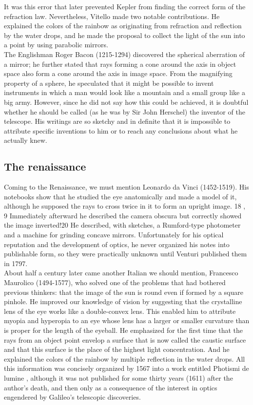             It was this error that later prevented Kepler from finding the correct form of the refraction law. Nevertheless, Vitello made two notable contributions. He explained the colors of the rainbow as originating from refraction and reflection by the water drops, and he made the proposal to collect the light of the sun into a point by using parabolic mirrors.\\

            The Englishman Roger Bacon (1215-1294) discovered the spherical aberration of a mirror; he further stated that rays forming a cone around the axis in object space also form a cone around the axis in image space. From the magnifying property of a sphere, he speculated that it might be possible to invent instruments in which a man would look like a mountain and a small group like a big army. However, since he did not say how this could be achieved, it is doubtful whether he should be called (as he was by Sir John Herschel) the inventor of the telescope. His writings are so sketchy and in definite that it is impossible to attribute specific inventions to him or to reach any conclusions about what he actually knew.

        \subsection{The renaissance}

            Coming to the Renaissance, we must mention Leonardo da Vinci (1452-1519). His notebooks show that he studied the eye anatomically and made a model of it, although he supposed the rays to cross twice in it to form an upright image. 18 , 9 Immediately afterward he described the camera obscura but correctly showed the image inverted!20 He described, with sketches, a Rumford-type photometer and a machine for grinding concave mirrors. Unfortunately for his optical reputation and the development of optics, he never organized his notes into publishable form, so they were practically unknown until Venturi published them in 1797.\\

            About half a century later came another Italian we should mention, Francesco Maurolico (1494-1577), who solved one of the problems that had bothered previous thinkers: that the image of the sun is round even if formed by a square pinhole. He improved our knowledge of vision by suggesting that the crystalline lens of the eye works like a double-convex lens. This enabled him to attribute myopia and hyperopia to an eye whose lens has a larger or smaller curvature than is proper for the length of the eyeball. He emphasized for the first time that the rays from an object point envelop a surface that is now called the caustic surface and that this surface is the place of the highest light concentration. And he explained the colors of the rainbow by multiple reflection in the water drops. All this information was concisely organized by 1567 into a work entitled Photismi de lumine , although it was not published for some thirty years (1611) after the author's death, and then only as a consequence of the interest in optics engendered by Galileo's telescopic discoveries.\\

